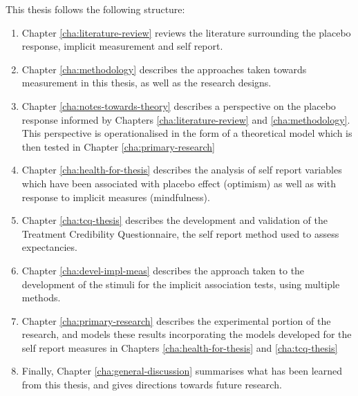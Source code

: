 This thesis follows the following structure:

\begin{enumerate}
\item Chapter \ref{cha:literature-review} reviews the literature surrounding the placebo response, implicit measurement and self report. 

\item Chapter \ref{cha:methodology} describes the approaches taken towards measurement in this thesis, as well as the research designs.

\item Chapter \ref{cha:notes-towards-theory} describes a perspective on the placebo response informed by Chapters \ref{cha:literature-review} and \ref{cha:methodology}. This perspective is operationalised in the form of a theoretical model which is then tested in Chapter \ref{cha:primary-research}

\item Chapter \ref{cha:health-for-thesis} describes the analysis of self report variables which have been associated with placebo effect (optimism) as well as with response to implicit measures (mindfulness). 

\item Chapter \ref{cha:tcq-thesis} describes the development and validation of the Treatment Credibility Questionnaire, the self report method used to assess expectancies.

\item Chapter \ref{cha:devel-impl-meas} describes the approach taken to the development of the stimuli for the implicit association tests, using multiple methods. 

\item Chapter \ref{cha:primary-research} describes the experimental portion of the research, and models these results incorporating the models developed for the self report measures in Chapters \ref{cha:health-for-thesis} and \ref{cha:tcq-thesis}

\item Finally, Chapter \ref{cha:general-discussion} summarises what has been learned from this thesis, and gives directions towards future research.

\end{enumerate}




